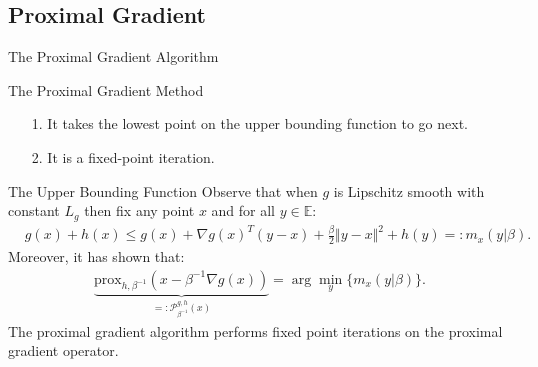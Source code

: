 \documentclass[11pt]{beamer}
\begin{document}
    \subsection{Proximal Gradient}
        \begin{frame}{The Proximal Gradient Algorithm}
            \begin{block}{The Proximal Gradient Method}
                \begin{algorithm}[H]
                    \scriptsize
                    \begin{algorithmic}[1]
                        \ENDIF
                    \ENDFOR
                    \end{algorithmic}
                    \caption{Proximal Gradient With Fixed Step-sizes}
                    \label{alg:1}
                \end{algorithm}
            \end{block}
            \begin{itemize}
                \item [1.] It takes the lowest point on the upper bounding function to go next. 
                \item [2.] It is a fixed-point iteration.
            \end{itemize}
        \end{frame}
        \begin{frame}{The Upper Bounding Function}
            Observe that when $g$ is Lipschitz smooth with constant $L_g$ then fix any point $x$ and for all $y\in \mathbb E$:  
            \begin{align*}
                & g(x) + h(x) \le 
                g(x) + \nabla g(x)^T(y - x) + \frac{\beta}{2} \Vert y - x\Vert^2
                + h(y) =: m_x(y|\beta). 
            \end{align*}
            Moreover, it has shown that: 
            \begin{align*}
                \underbrace{
                    \text{prox}_{h, \beta^{-1}}(x - \beta^{-1}\nabla g(x))
                    }_{
                        =:\mathcal P_{\beta^{-1}}^{g, h}(x)
                    } 
                = \arg\min_{y} \{m_x(y|\beta)\}.  
            \end{align*}
            The proximal gradient algorithm performs fixed point iterations on the proximal gradient operator. 
        \end{frame}
\end{document}
